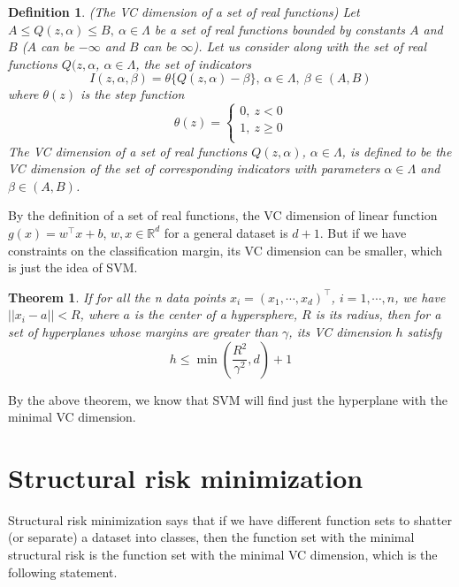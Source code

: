 \documentclass[a4paper]{report}
\newtheorem{theorem}{Theorem}[section]
\newtheorem{definition}{Definition}[section]
\begin{document}
\begin{definition}
    (The VC dimension of a set of real functions\cite{vapnik2013nature}) Let $A\leq Q(z,\alpha)\leq B,\ \alpha\in \Lambda$ be a set of real functions bounded by constants $A$ and $B$ ($A$ can be $-\infty$ and $B$ can be $\infty$).
    Let us consider along with the set of real functions $Q(z,\alpha$, $\alpha\in \Lambda$, the set of indicators
    \[
        I(z,\alpha,\beta)=\theta\{Q(z,\alpha)-\beta\},\ \alpha\in\Lambda, \ \beta\in(A,B)
    \]
    where $\theta(z)$ is the step function
    \[
        \theta(z)=
        \begin{cases}
            0,\ z<0 \\
            1,\ z\geq 0\\
        \end{cases}
    \]
    The VC dimension of a set of real functions $Q(z,\alpha)$, $\alpha\in \Lambda$, is defined to be the VC dimension of the set of corresponding indicators with parameters $\alpha\in\Lambda$ and $\beta\in(A,B)$.
\end{definition}

By the definition of a set of real functions, the VC dimension of linear function $g(x)=w^\top x+b$, $w,x\in\mathbb R^d$ for a general dataset is $d+1$. But if we have constraints on the classification margin, its VC dimension can be smaller, which is just the idea of SVM.

\begin{theorem}
    If for all the n data points $x_i=(x_1,\cdots,x_d)^\top$, $i=1,\cdots,n$, we have $||x_i-a||<R$, where $a$ is the center of a hypersphere, $R$ is its radius, then for a set of hyperplanes whose margins are greater than $\gamma$, its VC dimension $h$ satisfy
    \[
        h\leq \min(\frac{R^2}{\gamma^2},d)+1
    \]
\end{theorem}

By the above theorem, we know that SVM will find just the hyperplane with the minimal VC dimension.

\section{Structural risk minimization}

Structural risk minimization says that if we have different function sets to shatter (or separate) a dataset into classes, then the function set with the minimal structural risk is the function set with the minimal VC dimension, which is the following statement.
\end{document}
